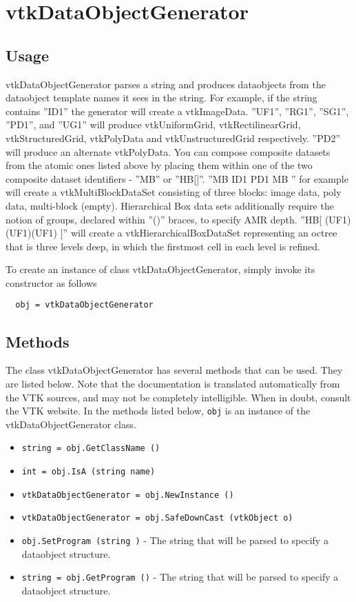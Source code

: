 \section{vtkDataObjectGenerator}

\subsection{Usage}

 vtkDataObjectGenerator parses a string and produces dataobjects from the
 dataobject template names it sees in the string. For example, if the string
 contains ''ID1'' the generator will create a vtkImageData. ''UF1'', ''RG1'', 
 ''SG1'', ''PD1'', and ''UG1'' will produce vtkUniformGrid, vtkRectilinearGrid,
 vtkStructuredGrid, vtkPolyData and vtkUnstructuredGrid respectively.
 ''PD2'' will produce an alternate vtkPolyData. You 
 can compose composite datasets from the atomic ones listed above
 by placing them within one of the two composite dataset identifiers
 - ''MB{}'' or ''HB[]''. ''MB{ ID1 PD1 MB{} }'' for example will create a 
 vtkMultiBlockDataSet consisting of three blocks: image data, poly data, 
 multi-block (empty). Hierarchical Box data sets additionally require
 the notion of groups, declared within ''()'' braces, to specify AMR depth.
 ''HB[ (UF1)(UF1)(UF1) ]'' will create a vtkHierarchicalBoxDataSet representing
 an octree that is three levels deep, in which the firstmost cell in each level
 is refined.

To create an instance of class vtkDataObjectGenerator, simply
invoke its constructor as follows
\begin{verbatim}
  obj = vtkDataObjectGenerator
\end{verbatim}
\subsection{Methods}

The class vtkDataObjectGenerator has several methods that can be used.
  They are listed below.
Note that the documentation is translated automatically from the VTK sources,
and may not be completely intelligible.  When in doubt, consult the VTK website.
In the methods listed below, \verb|obj| is an instance of the vtkDataObjectGenerator class.
\begin{itemize}
\item  \verb|string = obj.GetClassName ()|

\item  \verb|int = obj.IsA (string name)|

\item  \verb|vtkDataObjectGenerator = obj.NewInstance ()|

\item  \verb|vtkDataObjectGenerator = obj.SafeDownCast (vtkObject o)|

\item  \verb|obj.SetProgram (string )| -  The string that will be parsed to specify a dataobject structure.

\item  \verb|string = obj.GetProgram ()| -  The string that will be parsed to specify a dataobject structure.

\end{itemize}
